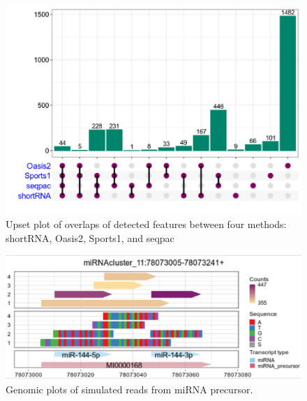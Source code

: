\documentclass[12pt,twoside]{reedthesis}
\begin{document}
\begin{figure}[H]

{\centering \includegraphics{thesis_files/figure-latex/3f14-1} 

}

\caption{Upset plot of overlaps of detected features between four methods: shortRNA, Oasis2, Sports1, and seqpac}\label{fig:3f14}
\end{figure}

\begin{figure}[H]

{\centering \includegraphics{thesis_files/figure-latex/3f15-1} 

}

\caption{Genomic plots of simulated reads from miRNA precursor.}\label{fig:3f15}
\end{figure}
\end{document}
